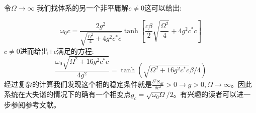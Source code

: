 \documentclass[supercite]{HustGraduPaper}
\begin{document}
令$\Omega \to \infty$ 我们找体系的另一个非平庸解$c \ne 0$这可以给出:

\begin{equation}
	\omega_0 c = \frac{2g^2}{\sqrt{\frac{\Omega^2}{4} + 4g^2 c^*c}} \tanh[\frac{c\beta}{2}\sqrt{\frac{\Omega^2}{4}}+4g^2 c^*c]
\end{equation}
$c \ne 0$进而给出$\pm c$满足的方程:
\begin{equation}
\frac{\omega_0 \sqrt{\Omega^2 + 16g^2 c^*c}}{4g^2} = \tanh(\sqrt{\Omega^2 + 16g^2 c^*c} \beta /4) 
\end{equation}
经过复杂的计算我们发现这个相的稳定条件就是$\frac{\delta^2 S_{\text{eff}}}{\delta c^2} >0 \to g >0, \Omega \to \infty$。因此系统在大失谐的情况下的确有一个相变点$g_c = \sqrt{\omega_0 \Omega}/{2}$。有兴趣的读者可以进一步参阅参考文献\cite{sun2018out}。
\end{document}
